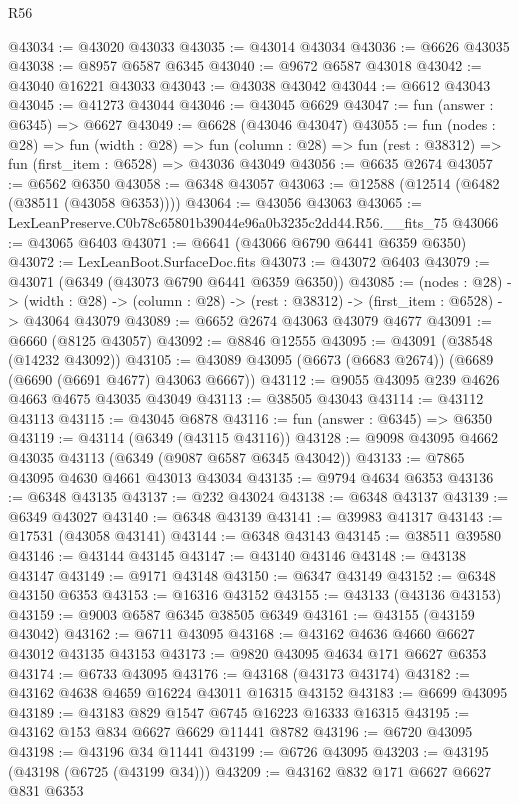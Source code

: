 \begin{lexlean}{R56}
\begin{coremodule}
@43034 := @43020 @43033
@43035 := @43014 @43034
@43036 := @6626 @43035
@43038 := @8957 @6587 @6345
@43040 := @9672 @6587 @43018
@43042 := @43040 @16221 @43033
@43043 := @43038 @43042
@43044 := @6612 @43043
@43045 := @41273 @43044
@43046 := @43045 @6629
@43047 := fun (answer : @6345) => @6627
@43049 := @6628 (@43046 @43047)
@43055 := fun (nodes : @28) =>
  fun (width : @28) =>
  fun (column : @28) => fun (rest : @38312) => fun (first_item : @6528) => @43036 @43049
@43056 := @6635 @2674
@43057 := @6562 @6350
@43058 := @6348 @43057
@43063 := @12588 (@12514 (@6482 (@38511 (@43058 @6353))))
@43064 := @43056 @43063
@43065 := LexLeanPreserve.C0b78c65801b39044e96a0b3235c2dd44.R56.__fits_75
@43066 := @43065 @6403
@43071 := @6641 (@43066 @6790 @6441 @6359 @6350)
@43072 := LexLeanBoot.SurfaceDoc.fits
@43073 := @43072 @6403
@43079 := @43071 (@6349 (@43073 @6790 @6441 @6359 @6350))
@43085 := (nodes : @28) ->
  (width : @28) -> (column : @28) -> (rest : @38312) -> (first_item : @6528) -> @43064 @43079
@43089 := @6652 @2674 @43063 @43079 @4677
@43091 := @6660 (@8125 @43057)
@43092 := @8846 @12555
@43095 := @43091 (@38548 (@14232 @43092))
@43105 := @43089 @43095 (@6673 (@6683 @2674)) (@6689 (@6690 (@6691 @4677) @43063 @6667))
@43112 := @9055 @43095 @239 @4626 @4663 @4675 @43035 @43049
@43113 := @38505 @43043
@43114 := @43112 @43113
@43115 := @43045 @6878
@43116 := fun (answer : @6345) => @6350
@43119 := @43114 (@6349 (@43115 @43116))
@43128 := @9098 @43095 @4662 @43035 @43113 (@6349 (@9087 @6587 @6345 @43042))
@43133 := @7865 @43095 @4630 @4661 @43013 @43034
@43135 := @9794 @4634 @6353
@43136 := @6348 @43135
@43137 := @232 @43024
@43138 := @6348 @43137
@43139 := @6349 @43027
@43140 := @6348 @43139
@43141 := @39983 @41317
@43143 := @17531 (@43058 @43141)
@43144 := @6348 @43143
@43145 := @38511 @39580
@43146 := @43144 @43145
@43147 := @43140 @43146
@43148 := @43138 @43147
@43149 := @9171 @43148
@43150 := @6347 @43149
@43152 := @6348 @43150 @6353
@43153 := @16316 @43152
@43155 := @43133 (@43136 @43153)
@43159 := @9003 @6587 @6345 @38505 @6349
@43161 := @43155 (@43159 @43042)
@43162 := @6711 @43095
@43168 := @43162 @4636 @4660 @6627 @43012 @43135 @43153
@43173 := @9820 @43095 @4634 @171 @6627 @6353
@43174 := @6733 @43095
@43176 := @43168 (@43173 @43174)
@43182 := @43162 @4638 @4659 @16224 @43011 @16315 @43152
@43183 := @6699 @43095
@43189 := @43183 @829 @1547 @6745 @16223 @16333 @16315
@43195 := @43162 @153 @834 @6627 @6629 @11441 @8782
@43196 := @6720 @43095
@43198 := @43196 @34 @11441
@43199 := @6726 @43095
@43203 := @43195 (@43198 (@6725 (@43199 @34)))
@43209 := @43162 @832 @171 @6627 @6627 @831 @6353

\end{coremodule}
\end{lexlean}
